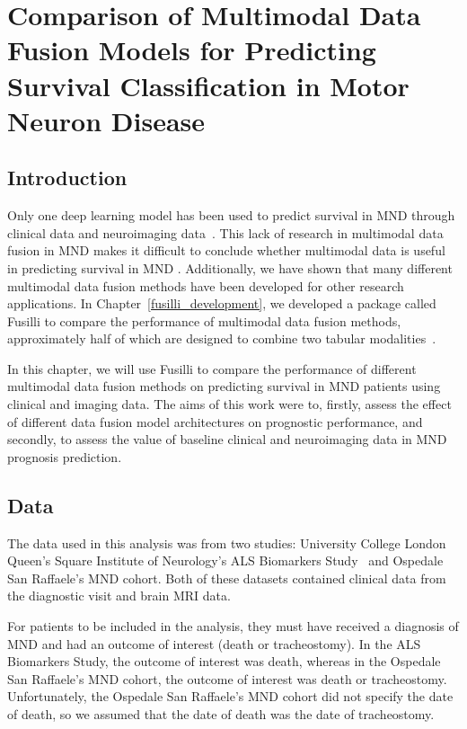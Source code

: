 \chapter{Comparison of Multimodal Data Fusion Models for Predicting Survival Classification in Motor Neuron Disease}
\label{fusilli_on_mnd}

\section{Introduction}
Only one deep learning model has been used to predict survival in MND through clinical data and neuroimaging data~\cite{vanderburghDeepLearningPredictions2017}.
This lack of research in multimodal data fusion in MND makes it difficult to conclude whether multimodal data is useful in predicting survival in MND .
Additionally, we have shown that many different multimodal data fusion methods have been developed for other research applications.
In Chapter~\ref{fusilli_development}, we developed a package called Fusilli to compare the performance of multimodal data fusion methods, approximately half of which are designed to combine two tabular modalities~\cite{townendFlorencejtFusilliFusilli2024}.

In this chapter, we will use Fusilli to compare the performance of different multimodal data fusion methods on predicting survival in MND patients using clinical and imaging data.
The aims of this work were to, firstly, assess the effect of different data fusion model architectures on prognostic performance, and secondly, to assess the value of baseline clinical and neuroimaging data in MND prognosis prediction.

\section{Data}

The data used in this analysis was from two studies: University College London Queen's Square Institute of Neurology's ALS Biomarkers Study~\cite{UKMNDCSG} and Ospedale San Raffaele's MND cohort.
Both of these datasets contained clinical data from the diagnostic visit and brain MRI data.

For patients to be included in the analysis, they must have received a diagnosis of MND and had an outcome of interest (death or tracheostomy).
In the ALS Biomarkers Study, the outcome of interest was death, whereas in the Ospedale San Raffaele's MND cohort, the outcome of interest was death or tracheostomy.
Unfortunately, the Ospedale San Raffaele's MND cohort did not specify the date of death, so we assumed that the date of death was the date of tracheostomy.

